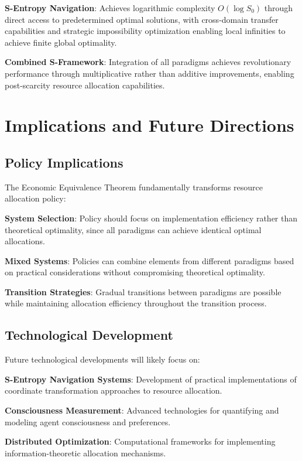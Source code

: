\documentclass[12pt,a4paper]{article}
\begin{document}
\textbf{S-Entropy Navigation}: Achieves logarithmic complexity $O(\log S_0)$ through direct access to predetermined optimal solutions, with cross-domain transfer capabilities and strategic impossibility optimization enabling local infinities to achieve finite global optimality.

\textbf{Combined S-Framework}: Integration of all paradigms achieves revolutionary performance through multiplicative rather than additive improvements, enabling post-scarcity resource allocation capabilities.

\section{Implications and Future Directions}

\subsection{Policy Implications}

The Economic Equivalence Theorem fundamentally transforms resource allocation policy:

\textbf{System Selection}: Policy should focus on implementation efficiency rather than theoretical optimality, since all paradigms can achieve identical optimal allocations.

\textbf{Mixed Systems}: Policies can combine elements from different paradigms based on practical considerations without compromising theoretical optimality.

\textbf{Transition Strategies}: Gradual transitions between paradigms are possible while maintaining allocation efficiency throughout the transition process.

\subsection{Technological Development}

Future technological developments will likely focus on:

\textbf{S-Entropy Navigation Systems}: Development of practical implementations of coordinate transformation approaches to resource allocation.

\textbf{Consciousness Measurement}: Advanced technologies for quantifying and modeling agent consciousness and preferences.

\textbf{Distributed Optimization}: Computational frameworks for implementing information-theoretic allocation mechanisms.
\end{document}
